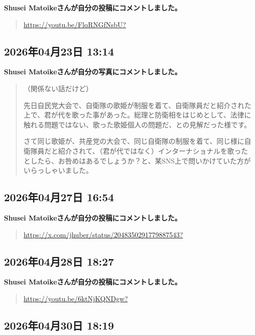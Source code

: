\textbf{Shusei Matoikeさんが自分の投稿にコメントしました。}

\begin{quote}
\url{https://youtu.be/FlqRNGfNsbU?}
\end{quote}

\subsection*{2026年04月23日 13:14}

\textbf{Shusei Matoikeさんが自分の写真にコメントしました。}

\begin{quote}
（関係ない話だけど）

先日自民党大会で、自衛隊の歌姫が制服を着て、自衛隊員だと紹介された上で、君が代を歌った事があった。総理と防衛相をはじめとして、法律に触れる問題ではない、歌った歌姫個人の問題だ、との見解だった様です。

さて同じ歌姫が、共産党の大会で、同じ自衛隊の制服を着て、同じ様に自衛隊員だと紹介されて、（君が代ではなく）インターナショナルを歌ったとしたら、お咎めはあるでしょうか？と、某SNS上で問いかけていた方がいらっしゃいました。
\end{quote}

\subsection*{2026年04月27日 16:54}

\textbf{Shusei Matoikeさんが自分の投稿にコメントしました。}

\begin{quote}
\url{https://x.com/jhuber/status/2048350291779887543?}
\end{quote}

\subsection*{2026年04月28日 18:27}

\textbf{Shusei Matoikeさんが自分の投稿にコメントしました。}

\begin{quote}
\url{https://youtu.be/6ktNjKQNDgw?}
\end{quote}

\subsection*{2026年04月30日 18:19}

